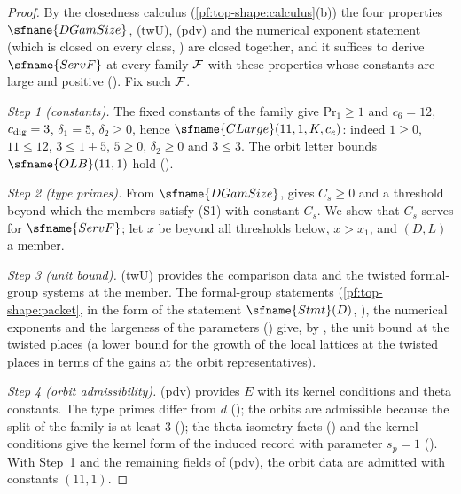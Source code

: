 \begin{proof}
By the closedness calculus (\cref{pf:top-shape:calculus}(b)) the four properties $\sfname{DGamSize}$, (twU), (pdv)
and the numerical exponent statement (which is closed on every class,
) are closed together, and it suffices to derive $\sfname{ServF}$ at every
family $\mathcal{F}$ with these properties whose constants are large and positive
(). Fix such $\mathcal{F}$.

\emph{Step 1 (constants).} The fixed constants of the family give $\mathrm{Pr}_1\ge1$ and $c_6=12$, $c_{\rm dig}=3$,
$\delta_1=5$, $\delta_2\ge0$, hence $\sfname{CLarge}(11,1,K,c_e)$: indeed $1\ge0$, $11\le12$, $3\le1+5$, $5\ge0$,
$\delta_2\ge0$ and $3\le3$. The orbit letter bounds $\sfname{OLB}(11,1)$ hold
().

\emph{Step 2 (type primes).} From $\sfname{DGamSize}$, 
gives $C_s\ge0$ and a threshold beyond which the members satisfy (S1) with constant $C_s$. We show that $C_s$ serves
for $\sfname{ServF}$; let $x$ be beyond all thresholds below, $x>x_1$, and $(D,L)$ a member.

\emph{Step 3 (unit bound).} (twU) provides the comparison data and the twisted formal-group systems at the member.
The formal-group statements (\cref{pf:top-shape:packet}, in the form of the statement $\sfname{Stmt}(D)$,
), the numerical exponents and the largeness of the
parameters () give, by
, the unit bound at the twisted places (a
lower bound for the growth of the local lattices at the twisted places in terms of the gains at the orbit
representatives).

\emph{Step 4 (orbit admissibility).} (pdv) provides $E$ with its kernel conditions and theta constants. The type
primes differ from $d$ (); the orbits are admissible because the split
of the family is at least $3$ (); the theta
isometry facts () and the kernel conditions give
the kernel form of the induced record with parameter $s_p=1$
(). With Step~1 and the remaining fields of (pdv), the
orbit data are admitted with constants $(11,1)$.


\end{proof}
